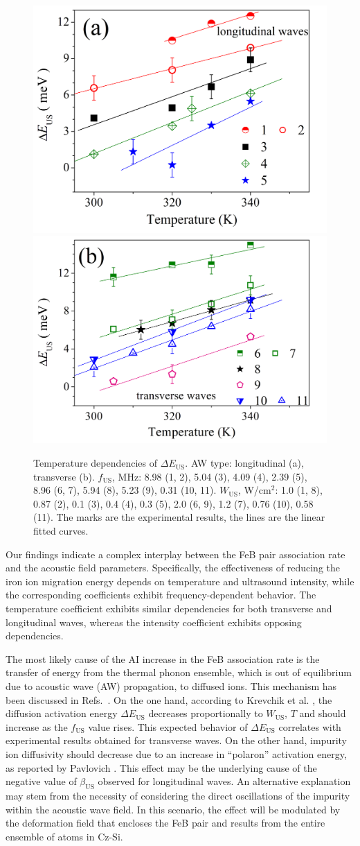 \documentclass{ttp}
\begin{document}
\begin{figure}
	\centering
     \includegraphics[width=0.4\linewidth]{Fig5a.png}
     \includegraphics[width=0.4\linewidth]{Fig5b.png}
	  \caption{Temperature dependencies of $\Delta E_\mathrm{US}$.
       AW type: longitudinal (a), transverse (b).
       $f_\mathrm{US}$, MHz:  8.98 (1, 2), 5.04 (3),
       4.09 (4), 2.39 (5), 8.96 (6, 7), 5.94 (8), 5.23 (9), 0.31 (10, 11).
       $W_\mathrm{US}$, W/cm$^2$: 1.0 (1, 8), 0.87 (2), 0.1 (3), 0.4 (4), 0.3 (5), 2.0 (6, 9), 1.2 (7),
        0.76 (10), 0.58 (11).
        The marks are the experimental results, the lines are the linear fitted curves.
}\label{fig5}
\end{figure}

Our findings indicate a complex interplay between the FeB pair association rate
and the acoustic field parameters.
Specifically, the effectiveness of reducing the iron ion migration energy
depends on temperature and ultrasound intensity,
while the corresponding coefficients exhibit frequency-dependent behavior.
The temperature coefficient exhibits similar dependencies for both transverse and longitudinal waves,
whereas the intensity coefficient exhibits opposing dependencies.

The most likely cause \cite{Olikh2021JAP} of the AI increase in the FeB association rate
is the transfer of energy from the thermal phonon ensemble,
which is out of equilibrium due to acoustic wave (AW) propagation, to diffused ions.
This mechanism has been discussed in Refs.~\cite{Pavlovich, Krevchik}.
On the one hand, according to Krevchik et al. \cite{Krevchik},
the diffusion activation energy $\Delta E_\mathrm{US}$ decreases proportionally
to $W_\mathrm{US}$, $T$ and should increase as the $f_\mathrm{US}$ value rises.
This expected behavior of $\Delta E_\mathrm{US}$  correlates with experimental results obtained for transverse waves.
On the other hand, impurity ion diffusivity should decrease due to an increase in
``polaron'' activation energy, as reported by Pavlovich \cite{Pavlovich}.
This effect may be the underlying cause of the negative value of $\beta_\mathrm{US}$ observed for longitudinal waves.
An alternative explanation may stem from the necessity of considering the direct oscillations of the impurity within the acoustic wave field.
In this scenario, the effect will be modulated by the deformation field that encloses the FeB pair
and results from the entire ensemble of atoms in Cz-Si.
\end{document}
